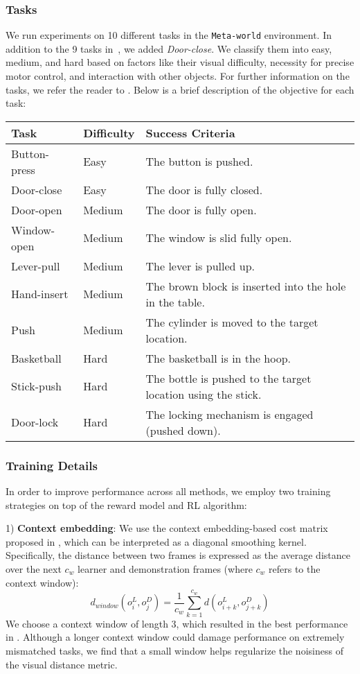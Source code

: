 \subsubsection{Tasks}
We run experiments on 10 different tasks in the \texttt{Meta-world} \cite{yu2021metaworldbenchmarkevaluationmultitask} environment. In addition to the 9 tasks in~\citet{fu2024robot}, we added \textit{Door-close}. We classify them into easy, medium, and hard based on factors like their visual difficulty, necessity for precise motor control, and interaction with other objects. For further information on the tasks, we refer the reader to \cite{fu2024robot}. Below is a brief description of the objective for each task:
\begin{table}[h]
\centering
\begin{tabular}{lll}
\toprule
\textbf{Task} & \textbf{Difficulty} & \textbf{Success Criteria} \\
\midrule
Button-press & Easy & The button is pushed. \\
Door-close & Easy & The door is fully closed. \\
Door-open & Medium & The door is fully open. \\
Window-open & Medium & The window is slid fully open. \\
Lever-pull & Medium & The lever is pulled up. \\
Hand-insert & Medium & The brown block is inserted into the hole in the table. \\
Push & Medium & The cylinder is moved to the target location. \\
Basketball & Hard & The basketball is in the hoop. \\
Stick-push & Hard & The bottle is pushed to the target location using the stick. \\
Door-lock & Hard & The locking mechanism is engaged (pushed down). \\
\bottomrule
\end{tabular}
\end{table}

\subsubsection{Training Details}

In order to improve performance across all methods, we employ two training strategies on top of the reward model and RL algorithm:

1) \textbf{Context embedding}: We use the context embedding-based cost matrix proposed in \cite{fu2024robot}, which can be interpreted as a diagonal smoothing kernel. Specifically, the distance between two frames is expressed as the average distance over the next $c_w$ learner and demonstration frames (where $c_w$ refers to the context window):
$$d_{window}(o_i^L, o_j^D) = \frac{1}{c_w} \sum_{k=1}^{c_w} d(o_{i+k}^L, o_{j+k}^D) $$
We choose a context window of length 3, which resulted in the best performance in \cite{fu2024robot}. Although a longer context window could damage performance on extremely mismatched tasks, we find that a small window helps regularize the noisiness of the visual distance metric.

